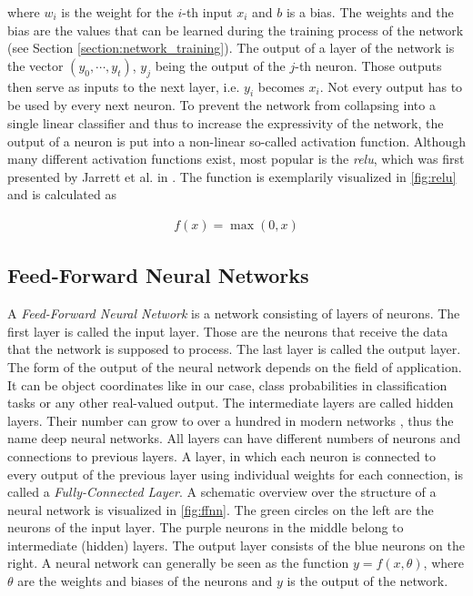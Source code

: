 \noindent where $w_i$ is the weight for the $i$-th input $x_i$ and $b$ is a bias. The weights and the bias are the values that can be learned during the training process of the network (see Section \ref{section:network_training}). The output of a layer of the network is the vector $(y_0, \cdots, y_t)$, $y_j$ being the output of the $j$-th neuron. Those outputs then serve as inputs to the next layer, i.e. $y_i$ becomes $x_i$. Not every output has to be used by every next neuron. To prevent the network from collapsing into a single linear classifier and thus to increase the expressivity of the network, the output of a neuron is put into a non-linear so-called activation function. Although many different activation functions exist, most popular is the \textit{\ac{relu}}, which was first presented by Jarrett et al. in \cite{relu}. The function is exemplarily visualized in \fig \ref{fig:relu} and is calculated as

\begin{align}
f(x) = \max(0, x)
\end{align} 

\subsection{Feed-Forward Neural Networks}

A \textit{Feed-Forward Neural Network} is a network consisting of layers of neurons. The first layer is called the input layer. Those are the neurons that receive the data that the network is supposed to process. The last layer is called the output layer. The form of the output of the neural network depends on the field of application. It can be object coordinates like in our case, class probabilities in classification tasks or any other real-valued output. The intermediate layers are called hidden layers. Their number can grow to over a hundred in modern networks \cite{resnet}, thus the name deep neural networks. All layers can have different numbers of neurons and connections to previous layers. A layer, in which each neuron is connected  to every output of the previous layer using individual weights for each connection, is called a \textit{Fully-Connected Layer}. A schematic overview over the structure of a neural network is visualized in \fig \ref{fig:ffnn}. The green circles on the left are the neurons of the input layer. The purple neurons in the middle belong to intermediate (hidden) layers. The output layer consists of the blue neurons on the right. A neural network can generally be seen as the function $y=f(x,\theta)$, where $\theta$ are the weights and biases of the neurons and $y$ is the output of the network.

